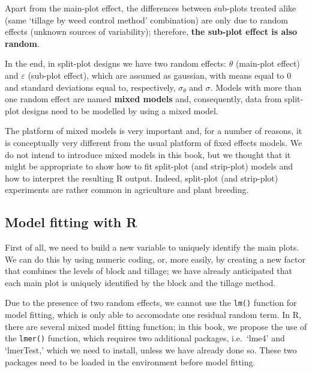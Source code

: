 \documentclass[a4paper,12pt,oneside]{book}
\newenvironment{Shaded}{\begin{snugshade}}{\end{snugshade}}
\newcommand{\SpecialCharTok}[1]{#1}
\newcommand{\OtherTok}[1]{#1}
\newcommand{\FunctionTok}[1]{#1}
\newcommand{\NormalTok}[1]{#1}
\begin{document}
Apart from the main-plot effect, the differences between sub-plots treated alike (same `tillage by weed control method' combination) are only due to random effects (unknown sources of variability); therefore, \textbf{the sub-plot effect is also random}.

In the end, in split-plot designs we have two random effects: \(\theta\) (main-plot effect) and \(\varepsilon\) (sub-plot effect), which are assumed as gaussian, with means equal to 0 and standard deviations equal to, respectively, \(\sigma_{\theta}\) and \(\sigma\). Models with more than one random effect are named \textbf{mixed models} and, consequently, data from split-plot designs need to be modelled by using a mixed model.

The platform of mixed models is very important and, for a number of reasons, it is conceptually very different from the usual platform of fixed effects models. We do not intend to introduce mixed models in this book, but we thought that it might be appropriate to show how to fit split-plot (and strip-plot) models and how to interpret the resulting R output. Indeed, split-plot (and strip-plot) experiments are rather common in agriculture and plant breeding.

\hypertarget{model-fitting-with-r-2}{%
\subsection{Model fitting with R}\label{model-fitting-with-r-2}}

First of all, we need to build a new variable to uniquely identify the main plots. We can do this by using numeric coding, or, more easily, by creating a new factor that combines the levels of block and tillage; we have already anticipated that each main plot is uniquely identified by the block and the tillage method.

\begin{Shaded}
\end{Shaded}

Due to the presence of two random effects, we cannot use the \texttt{lm()} function for model fitting, which is only able to accomodate one residual random term. In R, there are several mixed model fitting function; in this book, we propose the use of the \texttt{lmer()} function, which requires two additional packages, i.e.~`lme4' and `lmerTest,' which we need to install, unless we have already done so. These two packages need to be loaded in the environment before model fitting.
\end{document}
